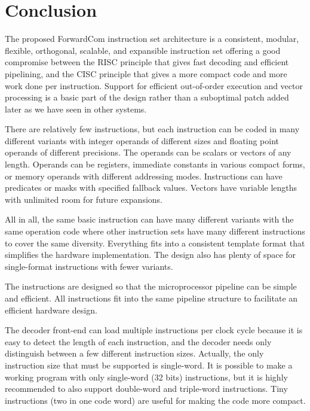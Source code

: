 \documentclass[forwardcom.tex]{subfiles}
\begin{document}
\RaggedRight

\chapter{Conclusion}
The proposed ForwardCom instruction set architecture is a consistent, modular, 
flexible, orthogonal, scalable, and expansible instruction set offering a good compromise between the RISC principle that gives fast decoding and efficient pipelining, and the CISC principle that gives a more compact code and more work done per instruction. Support for efficient out-of-order execution and vector processing is a basic part of the design rather than a suboptimal patch added later as we have seen in other systems.
\vspace{2mm}

There are relatively few instructions, but each instruction can be coded in many different variants with integer operands of different sizes and floating point operands of different precisions. The operands can be scalars or vectors of any length. Operands can be registers, immediate constants in various compact forms, or memory operands with different addressing modes.  Instructions can have predicates or masks with specified fallback values. Vectors have variable lengths with unlimited room for future expansions.
\vspace{2mm}

All in all, the same basic instruction can have many different variants with the same operation code where other instruction sets have many different instructions to cover the same diversity. Everything fits into a consistent template format that simplifies the hardware implementation. The design also has plenty of space for single-format instructions with fewer variants. 
\vspace{2mm}

The instructions are designed so that the microprocessor pipeline can be simple and efficient. All instructions fit into the same pipeline structure to facilitate an efficient hardware design.
\vspace{2mm}

The decoder front-end can load multiple instructions per clock cycle because it is easy to detect the length of each instruction, and the decoder needs only distinguish between a few different instruction sizes. Actually, the only instruction size that must be supported is single-word. It is 
possible to make a working program with only single-word (32 bits) instructions, but it is highly recommended to also support double-word and triple-word instructions. Tiny instructions (two in one code word) are useful for making the code more compact. 
\vspace{2mm}
\end{document}
